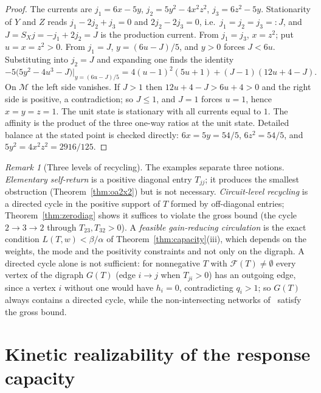 \documentclass[11pt,reqno]{amsart}
\theoremstyle{plain}
\theoremstyle{definition}
\theoremstyle{remark}
\newtheorem{remark}[theorem]{Remark}
\numberwithin{equation}{section}
\newcommand{\cone}{\mathcal{F}}
\begin{document}
\begin{proof}
The currents are $j_1=6x-5y$, $j_2=5y^2-4x^2z^2$, $j_3=6z^2-5y$.  Stationarity of $Y$ and $Z$ reads $j_1-2j_2+j_3=0$ and $2j_2-2j_3=0$, i.e.\ $j_1=j_2=j_3=:J$, and $J=S_Xj=-j_1+2j_2=J$ is the production current.  From $j_1=j_3$, $x=z^2$; put $u=x=z^2>0$.  From $j_1=J$, $y=(6u-J)/5$, and $y>0$ forces $J<6u$.  Substituting into $j_2=J$ and expanding one finds the identity
\begin{equation}\label{eq:zerodiagcert}
-5\big(5y^2-4u^3-J\big)\Big|_{y=(6u-J)/5}=4(u-1)^2(5u+1)+(J-1)(12u+4-J).
\end{equation}
On $\mathcal M$ the left side vanishes.  If $J>1$ then $12u+4-J>6u+4>0$ and the right side is positive, a contradiction; so $J\le1$, and $J=1$ forces $u=1$, hence $x=y=z=1$.  The unit state is stationary with all currents equal to $1$.  The affinity is the product of the three one-way ratios at the unit state.  Detailed balance at the stated point is checked directly: $6x=5y=54/5$, $6z^2=54/5$, and $5y^2=4x^2z^2=2916/125$.
\end{proof}

\begin{remark}[Three levels of recycling]\label{rem:levels}
The examples separate three notions.  \emph{Elementary self-return} is a positive diagonal entry $T_{jj}$; it produces the smallest obstruction (Theorem~\ref{thm:oa2x2}) but is not necessary.  \emph{Circuit-level recycling} is a directed cycle in the positive support of $T$ formed by off-diagonal entries; Theorem~\ref{thm:zerodiag} shows it suffices to violate the gross bound (the cycle $2\to3\to2$ through $T_{23},T_{32}>0$).  A \emph{feasible gain-reducing circulation} is the exact condition $L(T,w)<\beta/\alpha$ of Theorem~\ref{thm:capacity}(iii), which depends on the weights, the mode and the positivity constraints and not only on the digraph.  A directed cycle alone is not sufficient: for nonnegative $T$ with $\cone(T)\neq\emptyset$ every vertex of the digraph $G(T)$ (edge $i\to j$ when $T_{ji}>0$) has an outgoing edge, since a vertex $i$ without one would have $h_i=0$, contradicting $q_i>1$; so $G(T)$ always contains a directed cycle, while the non-intersecting networks of~\cite{DDL24} satisfy the gross bound.
\end{remark}

\section{Kinetic realizability of the response capacity}\label{sec:realizability}
\end{document}
